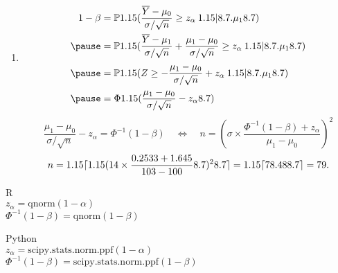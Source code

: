 \begin{frame}
	\begin{enumerate}
		\item[]
		\begin{align*}
	1-\beta & =\bbP\left(\frac{\overline{Y}-\mu_0}{\sigma/\sqrt{n}}\ge z_{\alpha} \:\bigg|\mu_1\right)\\\pause
& =
\bbP\left(\frac{\overline{Y}-\mu_1}{\sigma/\sqrt{n}} + \frac{\mu_1-\mu_0}{\sigma/\sqrt{n}}\ge z_{\alpha} \:\bigg|\mu_1\right)\\\pause
&=
\bbP\left(Z\ge  - \frac{\mu_1-\mu_0}{\sigma/\sqrt{n}}+ z_{\alpha} \:\bigg|\mu_1\right)\\\pause
&=\Phi\left( \frac{\mu_1-\mu_0}{\sigma/\sqrt{n}}- z_{\alpha} \right)
\end{align*}\pause
\[
	\frac{\mu_1-\mu_0}{\sigma/\sqrt{n}}- z_{\alpha}  = \Phi^{-1}(1-\beta)
	\quad\Longleftrightarrow\quad
	n = \left(\sigma\times \frac{\Phi^{-1}(1-\beta) + z_{\alpha}}{\mu_1-\mu_0}\right)^2
\]\pause
\[
	n = 1.15\lceil 1.15(14\times \frac{0.2533+1.645}{103-100}8.7)^2 8.7\rceil =1.15\lceil 78.48 8.7\rceil = 79.
\]
\myEnd
\end{enumerate}
\vfill
\begin{minipage}{0.34\textwidth}
\begin{center}
\small
 R\\
 $z_\alpha = \text{qnorm}(1-\alpha)$ \\
 $\Phi^{-1}(1-\beta) = \text{qnorm}(1-\beta)$
\end{center}
\end{minipage}
\begin{minipage}{0.64\textwidth}
\begin{center}
\small
 Python\\
$z_\alpha = \text{scipy.stats.norm.ppf}(1-\alpha)$ \\
$\Phi^{-1}(1-\beta) = \text{scipy.stats.norm.ppf}(1-\beta)$
\end{center}
\end{minipage}
\end{frame}
